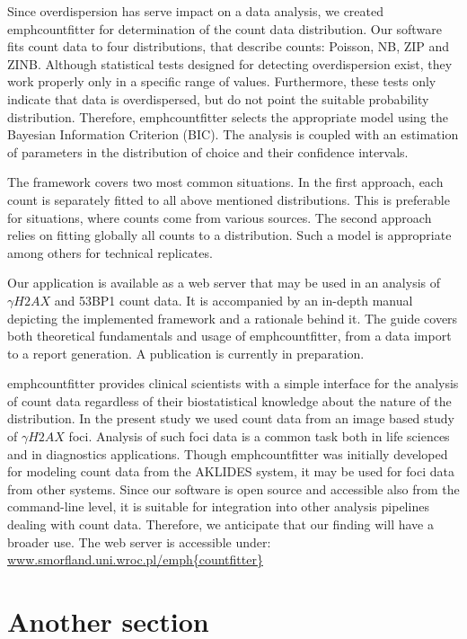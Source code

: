 Since overdispersion has serve impact on a data analysis, we created emph{countfitter} for 
determination of the count data distribution. Our software fits count data to 
four distributions, that describe counts: Poisson, NB, ZIP and ZINB. Although 
statistical tests designed for detecting overdispersion exist, they work 
properly only in a specific range of values. Furthermore, these tests only 
indicate that data is overdispersed, but do not point the suitable probability 
distribution. Therefore, emph{countfitter} selects the appropriate model using the Bayesian 
Information Criterion (BIC). The analysis is coupled with an estimation of 
parameters in the distribution of choice and their confidence intervals.  

The framework covers two most common situations. In the first approach, each 
count is separately fitted to all above mentioned distributions. This is 
preferable for situations, where counts come from various sources. The second 
approach relies on fitting globally all counts to a distribution. Such a model 
is appropriate among others for technical replicates.  

Our application is available as a web server that may be used in an 
analysis of $\gamma H2AX$ and 53BP1 count data. It is accompanied by 
an in-depth manual depicting the implemented framework and a rationale behind 
it. The guide covers both theoretical fundamentals and usage of emph{countfitter}, from a 
data import to a report generation. A publication is currently in preparation.

emph{countfitter} provides clinical scientists with a simple interface for the analysis of 
count data regardless of their biostatistical knowledge about the nature of the 
distribution. In the present study we used count data from an image based study 
of $\gamma H2AX$ foci. Analysis of such foci data is a common task both in life 
sciences and in diagnostics applications. Though emph{countfitter} was initially developed 
for modeling count data from the AKLIDES system, it may be used for foci 
data from other systems. Since our software is open source and accessible also 
from the command-line level, it is suitable for integration into other analysis 
pipelines dealing with count data. Therefore, we anticipate that our finding 
will have a broader use. The web server is accessible under: 
\url{www.smorfland.uni.wroc.pl/emph{countfitter}}



\section{Another section}

